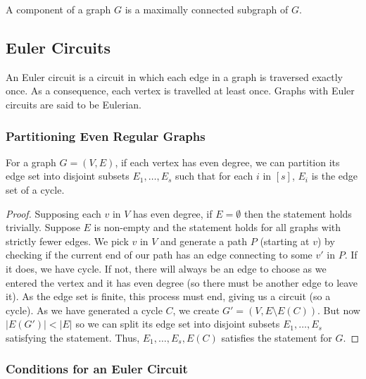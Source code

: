 A component of a graph $G$ is a maximally connected subgraph of $G$.

\subsection{Euler Circuits}

An Euler circuit is a circuit in which each edge in a graph is
traversed exactly once. As a consequence, each vertex is travelled 
at least once. Graphs with Euler circuits are said to be Eulerian.

\subsubsection{Partitioning Even Regular Graphs} \label{eulerpart}

For a graph $G = (V, E)$, if each vertex has even degree, we can
partition its edge set into disjoint subsets $E_1, \ldots, E_s$
such that for each $i$ in $[s]$, $E_i$ is the edge set of a cycle.
\begin{proof}
    Supposing each $v$ in $V$ has even degree, if $E = \emptyset$ then
    the statement holds trivially. Suppose $E$ is non-empty and the
    statement holds for all graphs with strictly fewer edges. We
    pick $v$ in $V$ and generate a path $P$ (starting at $v$) 
    by checking if the current end of our path has an edge connecting 
    to some $v'$ in $P$. If it does, we have cycle. If not, there will 
    always be an edge to choose as we entered the vertex and it has even degree 
    (so there must be another edge to leave it). As the edge set is finite,
    this process must end, giving us a circuit (so a cycle). As we
    have generated a cycle $C$, we create $G' = (V, E \setminus E(C))$. 
    But now $|E(G')| < |E|$ so we can split its edge set into
    disjoint subsets $E_1, \ldots, E_s$ satisfying the statement.
    Thus, $E_1, \ldots, E_s, E(C)$ satisfies the statement for $G$.
\end{proof}

\subsubsection{Conditions for an Euler Circuit}

